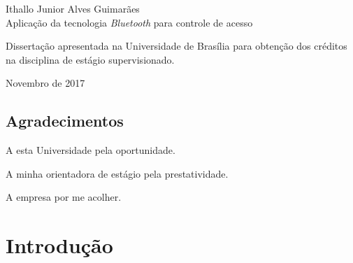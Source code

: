 \documentclass[12pt,fleqn]{article}
\begin{document}
\pagestyle {empty}



\begin{titlepage}
    \vfill
    \begin{center}
        {\large Ithallo Junior Alves Guimarães} \\[5cm]
        {\Huge Aplicação da tecnologia \textit{Bluetooth} para controle de acesso}\\[1cm]
        \hspace{.35\textwidth} %
        \begin{minipage}{.5\textwidth}
            
                Dissertação apresentada na Universidade de Brasília para obtenção 
                dos créditos na disciplina de estágio supervisionado.
            
        \end{minipage}
        \vfill
        Novembro de 2017
    \end{center}
\end{titlepage}


\pagestyle {empty}
\begin{center}
\section*{\textbf Agradecimentos}

\end{center}

A esta Universidade pela oportunidade.

A minha orientadora de estágio pela prestatividade.

A empresa por me acolher.
\newpage


\tableofcontents


\pagestyle {plain}



\setcounter{page}{0}
  
\setlength{\parindent}{1.25cm}  %

\parskip 5pt

\newpage

\section{Introdução}
\end{document}
